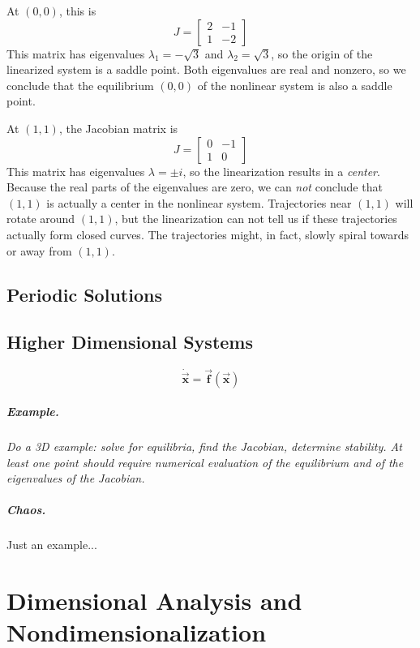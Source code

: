 \documentclass[reqno]{immbook}
\newcommand{\BF}{\vec{\textbf{f}}}
\newcommand{\BX}{\vec{\textbf{x}}}
\begin{document}
At $(0,0)$, this is
\begin{equation}
  J = \begin{bmatrix}
           2 & -1 \\
	   1 & -2
      \end{bmatrix}
\end{equation}
This matrix has eigenvalues $\lambda_1 = -\sqrt{3}$ 
and $\lambda_2 = \sqrt{3}$, so the
origin of the  linearized system is a saddle point.
Both eigenvalues are real and nonzero,
so we conclude that the equilibrium
$(0,0)$ of the nonlinear system is also a saddle point.

At $(1,1)$, the Jacobian matrix is
\begin{equation}
  J = \begin{bmatrix}
           0 & -1 \\
	   1 & 0
      \end{bmatrix}
\end{equation}
This matrix has eigenvalues $\lambda=\pm i$,
so the linearization results in a \emph{center}.
Because the real parts of the eigenvalues are
zero, we can \emph{not} conclude that $(1,1)$
is actually a center in the nonlinear system.
Trajectories near $(1,1)$ will rotate around $(1,1)$, but
the linearization can not tell us if these trajectories
actually form closed curves.
The trajectories might, in fact, slowly spiral
towards or away from $(1,1)$.

%
\section{Periodic Solutions}
%
\section{Higher Dimensional Systems}
\[
  \dot{\BX} = \BF(\BX)
\]
\paragraph{Example.}
\emph{Do a 3D example: solve for equilibria, find the
Jacobian, determine stability.  At least one point
should require numerical evaluation of the equilibrium
and of the eigenvalues of the Jacobian.}
\paragraph{Chaos.} Just an example...
%
%
%

\chapter[Dimensional Analysis]{Dimensional Analysis and Nondimensionalization}
\end{document}
